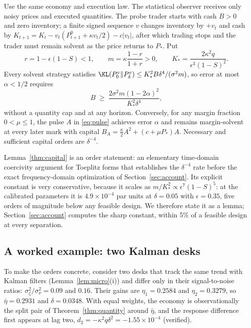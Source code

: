 \begin{lemma}\label{thm:capital}
Use the same economy and execution law. The statistical observer receives only noisy prices and executed quantities. The probe trader starts with cash $B>0$ and zero inventory; a finite signed sequence $v$ changes inventory by $+v_t$ and cash by $K_{t+1}=K_t-v_t(P^0_{t+1}+\kappa v_t/2)-c|v_t|$, after which trading stops and the trader must remain solvent as the price returns to $P_*$. Put
\[
r=1-\epsilon(1-S)<1,\qquad m=\kappa\frac{1-r}{1+r}>0,\qquad K_*=\frac{2\kappa^2q}{\epsilon^3(1-S)^2}.
\]
Every solvent strategy satisfies $\KL(P_0^v\|P_\delta^v)\le K_*^2B\delta^4/(\sigma^2m)$, so error at most $\alpha<1/2$ requires
\begin{equation}\label{eq:Bmin}
B\;\ge\;\frac{2\sigma^2m(1-2\alpha)^2}{K_*^2\delta^4},
\end{equation}
without a quantity cap and at any horizon. Conversely, for any margin fraction $0<\mu\le1$, the pulse $A$ in \eqref{eq:pulse} achieves error $\alpha$ and remains margin-solvent at every later mark with capital $B_A=\tfrac{\kappa}{2}A^2+(c+\mu P_*)A$. Necessary and sufficient capital orders are $\delta^{-4}$.
\end{lemma}

Lemma~\ref{thm:capital} is an order statement: an elementary time-domain coercivity argument for Toeplitz forms that establishes the $\delta^{-4}$ rate before the exact frequency-domain optimization of Section~\ref{sec:account}. Its explicit constant is very conservative, because it scales as $m/K_*^2\propto\epsilon^7(1-S)^5$: at the calibrated parameters it is $4.9\times10^{-4}$ par units at $\delta=0.05$ with $\epsilon=0.35$, five orders of magnitude below any feasible design. We therefore state it as a lemma; Section~\ref{sec:account} computes the sharp constant, within 5\% of a feasible design at every separation.

\subsection{A worked example: two Kalman desks}\label{sec:worked}

To make the orders concrete, consider two desks that track the same trend with Kalman filters (Lemma~\ref{lem:micro}(i)) and differ only in their signal-to-noise ratios: $\sigma_\zeta^2/\sigma_\nu^2=0.09$ and $0.16$. Their gains are $\eta_1=0.2584$ and $\eta_2=0.3279$, so $\bar\eta=0.2931$ and $\delta=0.0348$. With equal weights, the economy is observationally the split pair of Theorem~\ref{thm:quantity} around $\bar\eta$, and the response difference first appears at lag two, $d_2=-\kappa^2q\delta^2=-1.55\times10^{-4}$ (verified).

